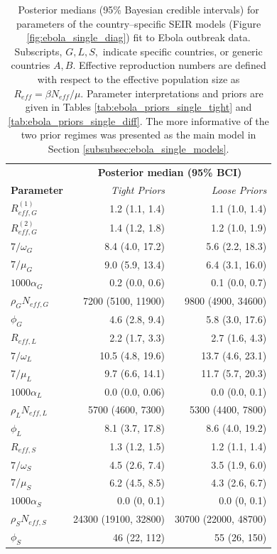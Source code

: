 \begin{table}[htbp]
	\caption[Posterior parameter estimates for country--specific SEIR models fit Ebola outbreak data.]{Posterior medians (95\% Bayesian credible intervals) for parameters of the country--specific SEIR models (Figure \ref{fig:ebola_single_diag}) fit to Ebola outbreak data. Subscripts, $ G,L,S, $ indicate specific countries, or generic countries $ A,B $. Effective reproduction numbers are defined with respect to the effective population size as $ R_{eff} = \beta N_{eff} /\mu $. Parameter interpretations and priors are given in Tables \ref{tab:ebola_priors_single_tight} and \ref{tab:ebola_priors_single_diff}. The more informative of the two prior regimes was presented as the main model in Section \ref{subsubsec:ebola_single_models}.}
	\label{tab:ebola_single_ests}
	\centering\footnotesize
	\begin{tabular}{lrr}
		\hline
		& \multicolumn{2}{c}{\textbf{Posterior median (95\% BCI)}}\\\cline{2-3}
		\textbf{Parameter} & \textit{Tight Priors} & \textit{Loose Priors} \\ 
		\hline
		$ R_{eff,G}^{(1)} $& 1.2 (1.1, 1.4) & 1.1 (1.0, 1.4) \\ 
		$ R_{eff,G}^{(2)} $& 1.4 (1.2, 1.8) & 1.2 (1.0, 1.9) \\ 
		$ 7/\omega_G $& 8.4 (4.0, 17.2) & 5.6 (2.2, 18.3) \\ 
		$ 7/\mu_G $& 9.0 (5.9, 13.4) & 6.4 (3.1, 16.0) \\ 
		$ 1000\alpha_{G} $& 0.2 (0.0, 0.6) & 0.1 (0.0, 0.7) \\ 
		$ \rho_GN_{eff,G} $& 7200 (5100, 11900) & 9800 (4900, 34600) \\ 
		$ \phi_{G} $& 4.6 (2.8, 9.4) & 5.8 (3.0, 17.6) \\ 
		\hline
		$ R_{eff,L} $& 2.2 (1.7, 3.3) & 2.7 (1.6, 4.3) \\ 
		$ 7/\omega_L $& 10.5 (4.8, 19.6) & 13.7 (4.6, 23.1) \\ 
		$ 7/\mu_L $& 9.7 (6.6, 14.1) & 11.7 (5.7, 20.3) \\ 
		$ 1000\alpha_L $& 0.0 (0.0, 0.06) & 0.0 (0.0, 0.1) \\ 
		$ \rho_LN_{eff,L} $& 5700 (4600, 7300) & 5300 (4400, 7800) \\ 
		$ \phi_L $& 8.1 (3.7, 17.8) & 8.6 (4.0, 19.2) \\ 
		\hline
		$ R_{eff,S} $& 1.3 (1.2, 1.5) & 1.2 (1.1, 1.4) \\ 
		$ 7/\omega_S $& 4.5 (2.6, 7.4) & 3.5 (1.9, 6.0) \\ 
		$ 7/\mu_S $& 6.2 (4.5, 8.5) & 4.3 (2.6, 6.7) \\ 
		$ 1000\alpha_S $& 0.0 (0, 0.1) & 0.0 (0, 0.1) \\ 
		$ \rho_SN_{eff,S} $& 24300 (19100, 32800) & 30700 (22000, 48700) \\ 
		$ \phi_S $& 46 (22, 112) & 55 (26, 150) \\ 
		\hline
	\end{tabular}
\end{table}

